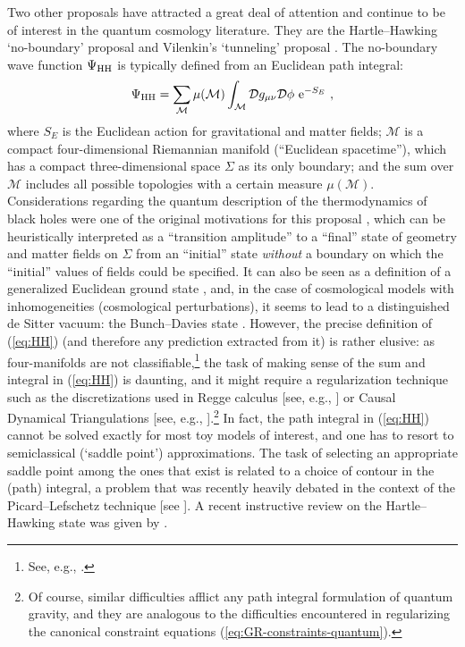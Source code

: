\documentclass[12pt]{iopart}
\def\eq#1{\begin{equation}\begin{aligned}#1\end{aligned}\end{equation}}
\def\eref#1{(\ref{eq:#1})}
\def\e{\mathrm{e}}
\begin{document}
Two other proposals have attracted a great deal of attention and continue to be of interest in the quantum cosmology literature. They are the Hartle--Hawking `no-boundary' proposal \citep{Hawking:1981gb,Hartle:1983ai} and Vilenkin's `tunneling' proposal \citep{Vilenkin:1987kf,Vilenkin:2018dch}. The no-boundary wave function $\Psi_{\rm HH}$ is typically defined from an Euclidean path integral:
\eq{\label{eq:HH}
\Psi_{\rm HH} = \sum_{\mathcal{M}}\mu(\mathcal{M})\int_{\mathcal{M}}\mathcal{D}g_{\mu\nu}\mathcal{D}\phi\ \e^{-S_{E}} \ ,
}
where $S_E$ is the Euclidean action for gravitational and matter fields; $\mathcal{M}$ is a compact four-dimensional Riemannian manifold (``Euclidean spacetime''), which has a compact three-dimensional space $\Sigma$ as its only boundary; and the sum over $\mathcal{M}$ includes all possible topologies with a certain measure $\mu(\mathcal{M})$. Considerations regarding the quantum description of the thermodynamics of black holes were one of the original motivations for this proposal \citep{Hawking:1979ig}, which can be heuristically interpreted as a ``transition amplitude'' to a ``final'' state of geometry and matter fields on $\Sigma$ from an ``initial'' state \emph{without} a boundary on which the ``initial'' values of fields could be specified. It can also be seen as a definition of a generalized Euclidean ground state \citep{Hartle:1983ai,Lehners:2023yrj}, and, in the case of cosmological models with inhomogeneities (cosmological perturbations), it seems to lead to a distinguished de Sitter vacuum: the Bunch--Davies state \citep{Laflamme:1987mx}. However, the precise definition of \eref{HH} (and therefore any prediction extracted from it) is rather elusive: as four-manifolds are not classifiable,\footnote{See, e.g., \citet{Geroch:1986iu}.} the task of making sense of the sum and integral in \eref{HH} is daunting, and it might require a regularization technique such as the discretizations used in Regge calculus [see, e.g., \citet{Williams:1996jb,Liu:2015bwa}] or Causal Dynamical Triangulations [see, e.g., \citet{Ambjorn:1998xu,Ambjorn:2022naa}].\footnote{Of course, similar difficulties afflict any path integral formulation of quantum gravity, and they are analogous to the difficulties encountered in regularizing the canonical constraint equations \eref{GR-constraints-quantum}.} In fact, the path integral in \eref{HH} cannot be solved exactly for most toy models of interest, and one has to resort to semiclassical (`saddle point') approximations. The task of selecting an appropriate saddle point among the ones that exist is related to a choice of contour in the (path) integral, a problem that was recently heavily debated in the context of the Picard--Lefschetz technique [see \citet{Feldbrugge:2017kzv,Feldbrugge:2017fcc,DiTucci:2019xcr,DiazDorronsoro:2017hti,Halliwell:2018ejl}]. A recent instructive review on the Hartle--Hawking state was given by \citet{Lehners:2023yrj}. 
\end{document}
